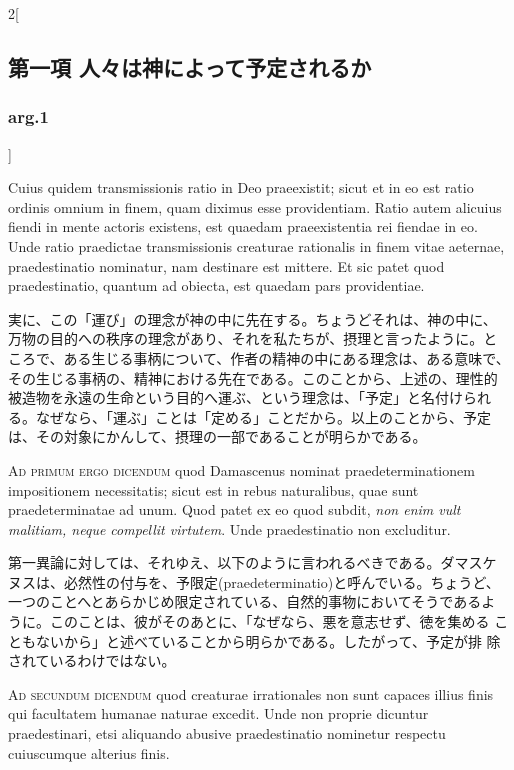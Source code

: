 \documentclass[paper=a4paper,fontsize=10pt,jafontsize=9pt,titlepage]{jlreq}
\begin{document}
\begin{paracol}{2}[\subsection{第一項 人々は神によって予定されるか}\subsubsection{arg.1}]
\switchcolumn*


Cuius quidem
transmissionis ratio in Deo praeexistit; sicut et in eo est ratio
ordinis omnium in finem, quam diximus esse providentiam. Ratio autem
alicuius fiendi in mente actoris existens, est quaedam praeexistentia
rei fiendae in eo. Unde ratio praedictae transmissionis creaturae
rationalis in finem vitae aeternae, praedestinatio nominatur, nam
destinare est mittere. Et sic patet quod praedestinatio, quantum ad
obiecta, est quaedam pars providentiae.


\switchcolumn


実に、この「運び」の理念が神の中に先在する。ちょうどそれは、神の中に、
万物の目的への秩序の理念があり、それを私たちが、摂理と言ったように。と
ころで、ある生じる事柄について、作者の精神の中にある理念は、ある意味で、
その生じる事柄の、精神における先在である。このことから、上述の、理性的
被造物を永遠の生命という目的へ運ぶ、という理念は、「予定」と名付けられ
る。なぜなら、「運ぶ」ことは「定める」ことだから。以上のことから、予定
は、その対象にかんして、摂理の一部であることが明らかである。


\switchcolumn*[\subsubsection{ad.1}]


{\scshape Ad primum ergo dicendum} quod Damascenus
nominat praedeterminationem impositionem necessitatis; sicut est in
rebus naturalibus, quae sunt praedeterminatae ad unum. Quod patet ex eo
quod subdit, {\itshape non enim vult malitiam, neque compellit virtutem}. Unde
praedestinatio non excluditur.


\switchcolumn


第一異論に対しては、それゆえ、以下のように言われるべきである。ダマスケ
ヌスは、必然性の付与を、予限定(praedeterminatio)と呼んでいる。ちょうど、
一つのことへとあらかじめ限定されている、自然的事物においてそうであるよ
うに。このことは、彼がそのあとに、「なぜなら、悪を意志せず、徳を集める
こともないから」と述べていることから明らかである。したがって、予定が排
除されているわけではない。


\switchcolumn*[\subsubsection{ad.2}]


{\scshape Ad secundum dicendum} quod creaturae
irrationales non sunt capaces illius finis qui facultatem humanae
naturae excedit. Unde non proprie dicuntur praedestinari, etsi aliquando
abusive praedestinatio nominetur respectu cuiuscumque alterius finis.



\end{paracol}
\end{document}
